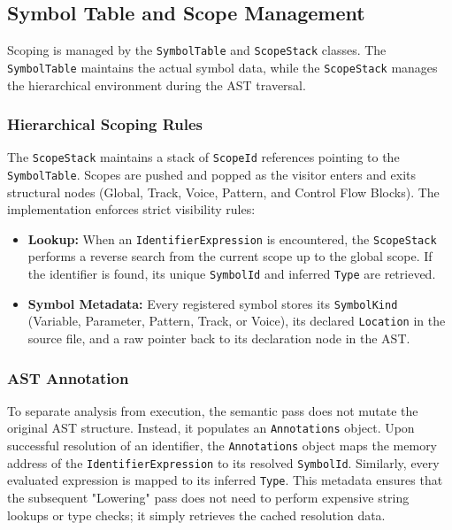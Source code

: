 \subsection{Symbol Table and Scope Management}

Scoping is managed by the \texttt{SymbolTable} and \texttt{ScopeStack} classes.
The \texttt{SymbolTable} maintains the actual symbol data, while the \texttt{ScopeStack} manages the
hierarchical environment during the AST traversal.

\subsubsection{Hierarchical Scoping Rules}

The \texttt{ScopeStack} maintains a stack of \texttt{ScopeId} references pointing to the \texttt{SymbolTable}.
Scopes are pushed and popped as the visitor enters and exits structural nodes (Global, Track, Voice, Pattern,
and Control Flow Blocks).
The implementation enforces strict visibility rules:
\begin{itemize}
  \item \textbf{Lookup:} When an \texttt{IdentifierExpression} is encountered, the \texttt{ScopeStack}
    performs a reverse search from the current scope up to the global scope. If the identifier is found, its
    unique \texttt{SymbolId} and inferred \texttt{Type} are retrieved.
  \item \textbf{Symbol Metadata:} Every registered symbol stores its \texttt{SymbolKind} (Variable,
    Parameter, Pattern, Track, or Voice), its declared \texttt{Location} in the source file, and a raw
    pointer back to its declaration node in the AST.
\end{itemize}

\subsubsection{AST Annotation}

To separate analysis from execution, the semantic pass does not mutate the original AST structure.
Instead, it populates an \texttt{Annotations} object.
Upon successful resolution of an identifier, the \texttt{Annotations} object maps the memory address of the
\texttt{IdentifierExpression} to its resolved \texttt{SymbolId}.
Similarly, every evaluated expression is mapped to its inferred \texttt{Type}.
This metadata ensures that the subsequent "Lowering" pass does not need to perform expensive string lookups
or type checks; it simply retrieves the cached resolution data.

